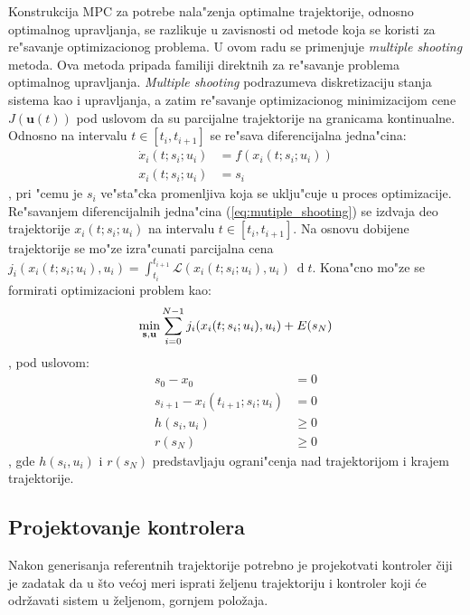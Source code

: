\documentclass[a4paper,11pt]{article}
\theoremstyle{definition} \newtheorem{deff}{Definicija}[section]
\theoremstyle{definition} \newtheorem{prim}[deff]{Primer}
\theoremstyle{plain} \newtheorem{teor}[deff]{Teorema}
\begin{document}
	Konstrukcija MPC za potrebe nala"zenja optimalne trajektorije, odnosno optimalnog upravljanja, se razlikuje u zavisnosti od metode koja se koristi za re"savanje optimizacionog problema. U ovom radu se primenjuje \emph{multiple shooting} metoda. Ova metoda pripada familiji direktnih za re"savanje problema optimalnog upravljanja. \emph{Multiple shooting} podrazumeva diskretizaciju stanja sistema kao i upravljanja, a zatim re"savanje optimizacionog minimizacijom cene $J(\mathbf{u}(t))$ pod uslovom da su parcijalne trajektorije na granicama kontinualne. Odnosno na intervalu $t\in[t_i, t_{i+1}]$ se re"sava diferencijalna jedna"cina:
	\begin{align}\label{eq:mutiple_shooting}
		\dot{x}_i(t; s_i; u_i) &= f(x_i(t; s_i; u_i)) \\
		x_i(t; s_i; u_i) &= s_i
	\end{align},
	pri "cemu je $s_i$ ve"sta"cka promenljiva koja se uklju"cuje u proces optimizacije. Re"savanjem diferencijalnih jedna"cina (\ref{eq:mutiple_shooting}) se izdvaja deo trajektorije $x_i(t; s_i; u_i)$ na intervalu $t\in[t_i, t_{i+1}]$. Na osnovu dobijene trajektorije se mo"ze izra"cunati parcijalna cena $j_i(x_i(t; s_i; u_i), u_i) = \int_{t_i}^{t_{i+1}}\mathcal{L}(x_i(t; s_i; u_i), u_i)~\operatorname{d}t$. Kona"cno mo"ze se formirati optimizacioni problem kao:
	\begin{equation}\label{eq:multiple_minimize}
		\min_{\mathbf{s}, \mathbf{u}} \sum_{i=0}^{N-1} j_i(x_i(t; s_i; u_i), u_i) + E(s_N) \\
	\end{equation}, pod uslovom:
	\begin{align}
		s_0 - x_0 &= 0\\
		s_{i+1} - x_i(t_{i+1}; s_i; u_i) &= 0\\
		h(s_i, u_i) &\geq 0\\
		r(s_N) &\geq 0
	\end{align}, gde $h(s_i, u_i)$ i $r(s_N)$ predstavljaju ograni"cenja nad trajektorijom i krajem trajektorije.
	
	
	
	
	
	
	 
	
	
	\newpage
	\subsection{Projektovanje kontrolera}
	
	Nakon generisanja referentnih trajektorije potrebno je projekotvati kontroler čiji je zadatak da u što većoj meri isprati željenu trajektoriju i kontroler koji će održavati sistem u željenom, gornjem položaja. \\
	
\end{document}
